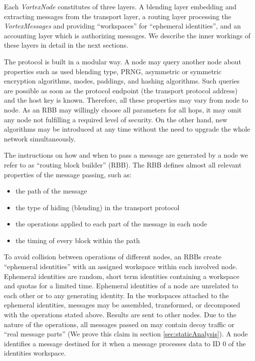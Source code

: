 \documentclass[acmsmall, screen, final]{acmart}
\begin{document}
	Each \emph{VortexNode} constitutes of three layers. A blending layer embedding and extracting messages from the transport layer, a routing layer processing the \emph{VortexMessages} and providing ``workspaces'' for ``ephemeral identities'', and an accounting layer which is authorizing messages. We describe the inner workings of these layers in detail in the next sections.
	
	The protocol is built in a modular way. A node may query another node about properties such as used blending type, PRNG, asymmetric or symmetric encryption algorithms, modes, paddings, and hashing algorithms. Such queries are possible as soon as the protocol endpoint (the transport protocol address) and the host key is known. Therefore, all these properties may vary from node to node. As an RBB may willingly choose all parameters for all hops, it may omit any node not fulfilling a required level of security. On the other hand, new algorithms may be introduced at any time without the need to upgrade the whole network simultaneously. 
	
	The instructions on how and when to pass a message are generated by a node we refer to as ``routing block builder'' (RBB). The RBB defines almost all relevant properties of the message passing, such as: 
	\begin{itemize}
		\item the path of the message
		\item the type of hiding (blending) in the transport protocol
		\item the operations applied to each part of the message in each node
		\item the timing of every block within the path
	\end{itemize}
	
	To avoid collision between operations of different nodes, an RBBs create ``ephemeral identities'' with an assigned workspace within each involved node. Ephemeral identities are random, short term identities containing a workspace and quotas for a limited time. Ephemeral identities of a node are unrelated to each other or to any generating identity. In the workspaces attached to the ephemeral identities, messages may be assembled, transformed, or decomposed with the operations stated above. Results are sent to other nodes. Due to the nature of the operations, all messages passed on may contain decoy traffic or ``real message parts'' (We prove this claim in section \ref{sec:staticAnalysis}). A node identifies a message destined for it when a message processes data to ID 0 of the identities workspace.
	
\end{document}
